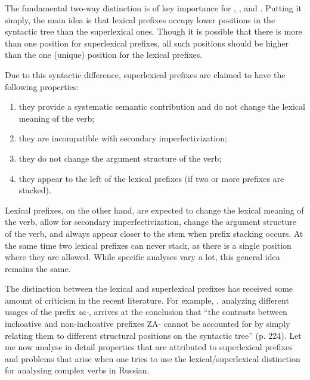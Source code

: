 The fundamental two-way distinction is of key importance for \citet{Romanova:04}, \citet{Svenonius:04b}, and \citet{Ramchand:04}. Putting it simply, the main idea is that lexical prefixes occupy lower positions in the syntactic tree than the superlexical ones. Though it is possible that there is more than one position for superlexical prefixes, all such positions should be higher than the one (unique) position for the lexical prefixes. 

Due to this syntactic difference, superlexical prefixes are claimed to have the following properties:
\begin{enumerate}
\item they provide a systematic semantic contribution and do not change the lexical meaning of the verb;
\item they are incompatible with secondary imperfectivization;
\item they do not change the argument structure of the verb;
\item they appear to the left of the lexical prefixes (if two or more prefixes are stacked). 
\end{enumerate}

Lexical prefixes, on the other hand, are expected to change the lexical meaning of the verb, allow for secondary imperfectivization, change the argument structure of the verb, and always appear closer to the stem when prefix stacking occurs. At the same time two lexical prefixes can never stack, as there is a single position where they are allowed. While specific analyses vary a lot, this general idea remains the same. 

The distinction between the lexical and superlexical prefixes has received some amount of criticism in the recent literature. For example, \citet{Braginsky:08}, analyzing different usages of the prefix \textit{za-}, arrives at the conclusion that ``the contrasts
between inchoative and non-inchoative prefixes ZA- cannot be accounted for by
simply relating them to different structural positions on the syntactic tree'' (p. 224). Let me now analyse in detail properties that are attributed to superlexical prefixes and problems that arise when one tries to use the lexical/superlexical distinction for analysing complex verbs in Russian.


